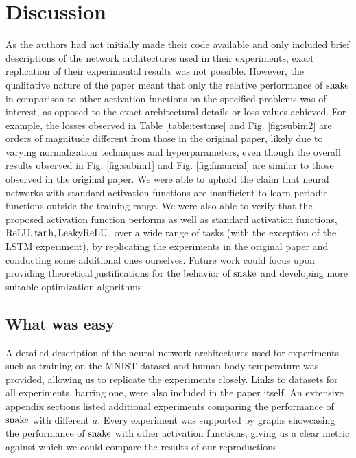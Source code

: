 \section{Discussion}


As the authors had not initially made their code available and only included brief descriptions of the network architectures used in their experiments, exact replication of their experimental results was not possible. However, the qualitative nature of the paper meant that only the relative performance of $ \operatorname{snake} $ in comparison to other activation functions on the specified problems was of interest, as opposed to the exact architectural details or loss values achieved. For example, the losses observed in Table \ref{table:testmse} and Fig. \ref{fig:subim2} are orders of magnitude different from those in the original paper, likely due to varying normalization techniques and hyperparameters, even though the overall results observed in Fig. \ref{fig:subim1} and Fig. \ref{fig:financial} are similar to those observed in the original paper. We were able to uphold the claim that neural networks with standard activation functions are insufficient to learn periodic functions outside the training range. We were also able to verify that the proposed activation function performs as well as standard activation functions, $ \operatorname{ReLU}, \tanh, \operatorname{LeakyReLU} $, over a wide range of tasks (with the exception of the LSTM experiment), by replicating the experiments in the original paper and conducting some additional ones ourselves. Future work could focus upon providing theoretical justifications for the behavior of $ \operatorname{snake} $ and developing more suitable optimization algorithms.


\subsection{What was easy}

A detailed description of the neural network architectures used for experiments such as training on the MNIST dataset and human body temperature was provided, allowing us to replicate the experiments closely. Links to datasets for all experiments, barring one, were also included in the paper itself. An extensive appendix sections listed additional experiments comparing the performance of $ \operatorname{snake} $ with different $a$. Every experiment was supported by graphs showcasing the performance of $ \operatorname{snake} $ with other activation functions, giving us a clear metric against which we could compare the results of our reproductions.

